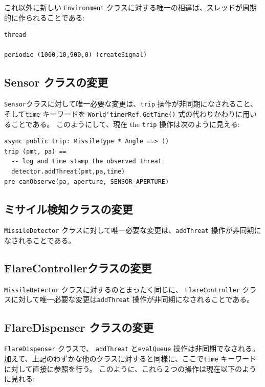 \documentclass[\pformat,12pt]{jreport}
\begin{document}
これ以外に新しい \texttt{Environment} クラスに対する唯一の相違は、スレッドが周期的に作られることである:

\begin{lstlisting}
thread

periodic (1000,10,900,0) (createSignal)
\end{lstlisting}

\subsection{Sensor クラスの変更}

 \texttt{Sensor}クラスに対して唯一必要な変更は、\texttt{trip} 操作が非同期になされること、そして\texttt{time} キーワードを \texttt{World`timerRef.GetTime()} 式の代わりかわりに用いることである。
このようにして、現在 the \texttt{trip} 操作は次のように見える:

\begin{lstlisting}
async public trip: MissileType * Angle ==> ()
trip (pmt, pa) ==
  -- log and time stamp the observed threat
  detector.addThreat(pmt,pa,time)
pre canObserve(pa, aperture, SENSOR_APERTURE)
\end{lstlisting}

\subsection{ミサイル検知クラスの変更}

 \texttt{MissileDetector} クラスに対して唯一必要な変更は、\texttt{addThreat} 操作が非同期になされることである。

\subsection{FlareControllerクラスの変更}

 \texttt{MissileDetector} クラスに対するのとまったく同じに、 \texttt{FlareController} クラスに対して唯一必要な変更は\texttt{addThreat} 操作が非同期になされることである。

\subsection{FlareDispenser クラスの変更}

 \texttt{FlareDispenser} クラスで、 \texttt{addThreat} と\texttt{evalQueue} 操作は非同期でなされる。
加えて、上記のわずかな他のクラスに対すると同様に、ここで\texttt{time} キーワードに対して直接に参照を行う。
このように、これら２つの操作は現在以下のように見れる:
\end{document}
